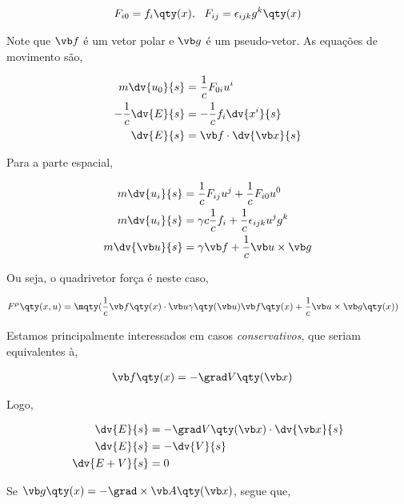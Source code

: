 \documentclass[twoside]{amsart}
\numberwithin{equation}{section}
\begin{document}
\begin{refsection}
\begin{align}
    F_{i0}=f_i\qty(x),\ \ F_{ij}=\epsilon_{ijk}g^k\qty(x)
\end{align}

Note que $\vb f$ é um vetor polar e $\vb g$ é um pseudo-vetor. As equações de movimento são,

\begin{align}
    m\dv{u_0}{s}&=\frac1cF_{0i}u^i\\
    -\frac1c\dv{E}{s}&=-\frac1cf_i\dv{x^i}{s}\\
    \dv{E}{s}&=\vb f\cdot\dv{\vb x}{s}
\end{align}

Para a parte espacial,

\begin{align}
    m\dv{u_i}{s}&=\frac1cF_{ij}u^j+\frac1cF_{i0}u^0\\
    m\dv{u_i}{s}&=\gamma c \frac1cf_i+\frac1c\epsilon_{ijk}u^jg^k\\
    m\dv{\vb u}{s}&=\gamma\vb f+\frac1c\vb u\times\vb g
\end{align}

Ou seja, o quadrivetor força é neste caso,

\begin{align}
    F^\mu\qty(x,u)=\mqty(\frac1c\vb f\qty(x)\cdot \vb u&\gamma\qty(\vb u) \vb f\qty(x)+\frac1c\vb u\times\vb g\qty(x))
\end{align}

Estamos principalmente interessados em casos \emph{conservativos}, que seriam equivalentes à,

\begin{align}
    \vb f\qty(x)&=-\grad V\qty(\vb x)
\end{align}

Logo, 

\begin{align}
    \dv{E}{s}&=-\grad V\qty(\vb x)\cdot\dv{\vb x}{s}\\
    \dv{E}{s}&=-\dv{V}{s}\\
    \dv{E+V}{s}&=0
\end{align}

Se $\vb g\qty(x)=-\grad\times \vb A\qty(\vb x)$, segue que,


\end{refsection}
\end{document}
